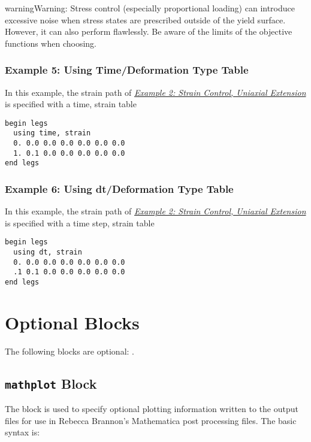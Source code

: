 \documentclass[letterpaper,10pt,english]{sphinxmanual}
\begin{document}
\begin{notice}{warning}{Warning:}
Stress control (especially proportional loading) can introduce excessive noise
when stress states are prescribed outside of the yield surface. However, it
can also perform flawlessly. Be aware of the limits of the objective functions
when choosing.
\end{notice}


\subsubsection{Example 5: Using Time/Deformation Type Table}
\label{Files/input_file_formatting:example-5-using-time-deformation-type-table}\label{Files/input_file_formatting:example-5}
In this example, the strain path of {\hyperref[Files/input_file_formatting:example-2]{\emph{Example 2: Strain Control, Uniaxial Extension}}} is specified with a time,
strain table

\begin{Verbatim}[commandchars=\\\{\}]
begin legs
  using time, strain
  0. 0.0 0.0 0.0 0.0 0.0 0.0
  1. 0.1 0.0 0.0 0.0 0.0 0.0
end legs
\end{Verbatim}


\subsubsection{Example 6: Using dt/Deformation Type Table}
\label{Files/input_file_formatting:example-6-using-dt-deformation-type-table}
In this example, the strain path of {\hyperref[Files/input_file_formatting:example-2]{\emph{Example 2: Strain Control, Uniaxial Extension}}} is specified with a time
step, strain table

\begin{Verbatim}[commandchars=\\\{\}]
begin legs
  using dt, strain
  0. 0.0 0.0 0.0 0.0 0.0 0.0
  .1 0.1 0.0 0.0 0.0 0.0 0.0
end legs
\end{Verbatim}


\section{Optional Blocks}
\label{Files/input_file_formatting:optional-blocks}\label{Files/input_file_formatting:id3}
The following blocks are optional: .


\subsection{\texttt{mathplot} Block}
\label{Files/input_file_formatting:mathplot-block}
The  block is used to specify optional plotting information written
to the  output files for use in Rebecca Brannon's
Mathematica post processing files. The basic syntax is:
\end{document}
